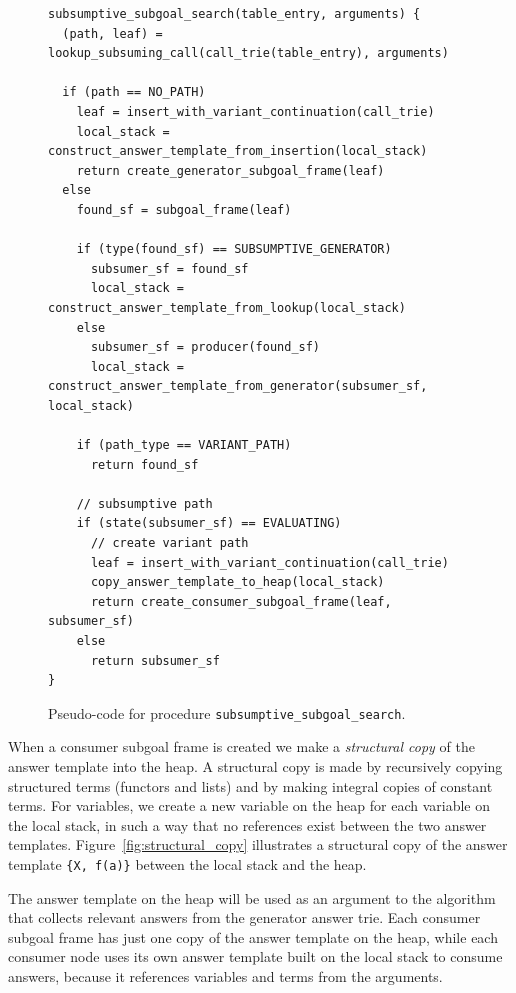\begin{figure}[ht]
\begin{Verbatim}
subsumptive_subgoal_search(table_entry, arguments) {
  (path, leaf) = lookup_subsuming_call(call_trie(table_entry), arguments)
  
  if (path == NO_PATH)
    leaf = insert_with_variant_continuation(call_trie)
    local_stack = construct_answer_template_from_insertion(local_stack)
    return create_generator_subgoal_frame(leaf)
  else
    found_sf = subgoal_frame(leaf)
    
    if (type(found_sf) == SUBSUMPTIVE_GENERATOR)
      subsumer_sf = found_sf
      local_stack = construct_answer_template_from_lookup(local_stack)
    else
      subsumer_sf = producer(found_sf)
      local_stack = construct_answer_template_from_generator(subsumer_sf, local_stack)
    
    if (path_type == VARIANT_PATH)
      return found_sf
    
    // subsumptive path
    if (state(subsumer_sf) == EVALUATING)
      // create variant path
      leaf = insert_with_variant_continuation(call_trie)
      copy_answer_template_to_heap(local_stack)
      return create_consumer_subgoal_frame(leaf, subsumer_sf)
    else
      return subsumer_sf
}
\end{Verbatim}
\caption{Pseudo-code for procedure \texttt{subsumptive\_subgoal\_search}.}
\label{fig:subsumptive_subgoal_search}
\end{figure}

When a consumer subgoal frame is created we make a \textit{structural copy} of the answer template
into the heap. A structural copy is made by recursively copying structured terms (functors and lists)
and by making integral copies of constant terms.
For variables, we create a new variable on the heap for each variable on the local stack, in such a way
that no references exist between the two answer templates.
Figure~\ref{fig:structural_copy} illustrates a structural copy of the answer template
\texttt{\{X,~f(a)\}} between the local stack and the heap.

The answer template on the heap will be used as an argument
to the algorithm that collects relevant answers from the generator answer trie.
Each consumer subgoal frame has just one copy of the answer template on the heap,
while each consumer node uses its own answer template built on the local stack to
consume answers, because it references variables
and terms from the arguments.

